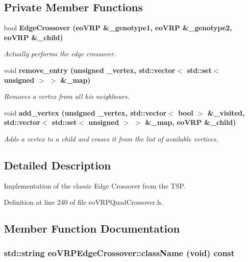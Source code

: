 \subsection*{Private Member Functions}
\begin{CompactItemize}
\item 
bool \bf{Edge\-Crossover} (\bf{eo\-VRP} \&\_\-genotype1, \bf{eo\-VRP} \&\_\-genotype2, \bf{eo\-VRP} \&\_\-child)
\begin{CompactList}\small\item\em Actually performs the edge crossover. \item\end{CompactList}\item 
void \bf{remove\_\-entry} (unsigned \_\-vertex, std::vector$<$ std::set$<$ unsigned $>$ $>$ \&\_\-map)
\begin{CompactList}\small\item\em Removes a vertex from all his neighbours. \item\end{CompactList}\item 
void \bf{add\_\-vertex} (unsigned \_\-vertex, std::vector$<$ bool $>$ \&\_\-visited, std::vector$<$ std::set$<$ unsigned $>$ $>$ \&\_\-map, \bf{eo\-VRP} \&\_\-child)
\begin{CompactList}\small\item\em Adds a vertex to a child and erases it from the list of available vertices. \item\end{CompactList}\end{CompactItemize}


\subsection{Detailed Description}
Implementation of the classic Edge Crossover from the TSP. 



Definition at line 240 of file eo\-VRPQuad\-Crossover.h.

\subsection{Member Function Documentation}
\subsubsection{\setlength{\rightskip}{0pt plus 5cm}std::string eo\-VRPEdge\-Crossover::class\-Name (void) const\hspace{0.3cm}{\tt  [inline, virtual]}}\label{classeo_v_r_p_edge_crossover_8b2a199b70442852f93b2a34a42cf1e4}


